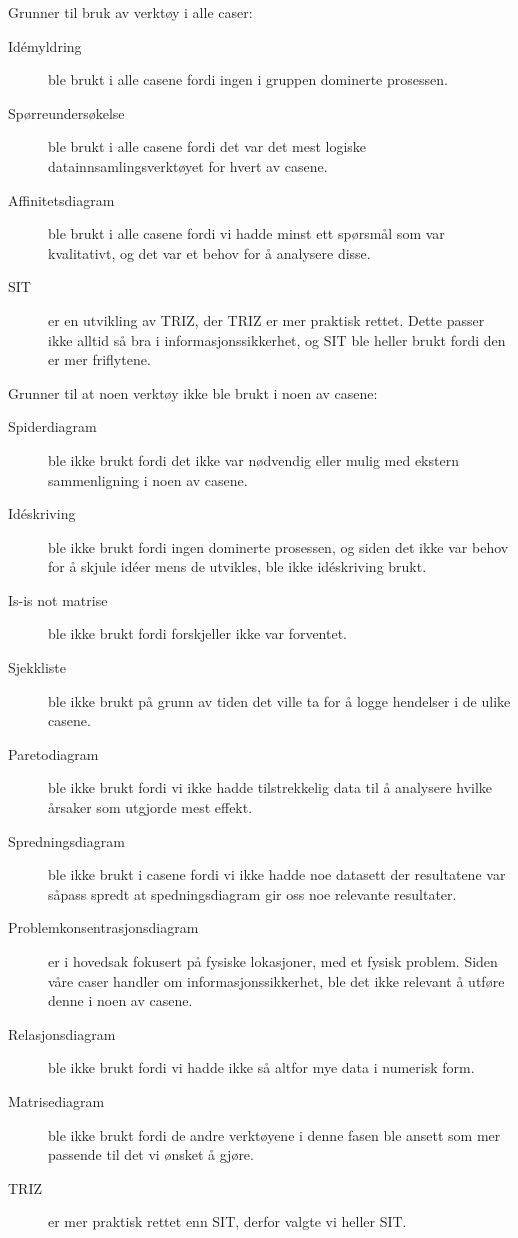 Grunner til bruk av verktøy i alle caser:
\begin{description}
    \item[Idémyldring] ble brukt i alle casene fordi ingen i gruppen dominerte prosessen.
    \item[Spørreundersøkelse] ble brukt i alle casene fordi det var det mest logiske datainnsamlingsverktøyet for hvert av casene.
    \item[Affinitetsdiagram] ble brukt i alle casene fordi vi hadde minst ett spørsmål som var kvalitativt, og det var et behov for å analysere disse.
    \item[SIT] er en utvikling av TRIZ, der TRIZ er mer praktisk rettet. Dette passer ikke alltid så bra i informasjonssikkerhet, og SIT ble heller brukt fordi den er mer friflytene. 
\end{description}

Grunner til at noen verktøy ikke ble brukt i noen av casene:
\begin{description}
    \item[Spiderdiagram] ble ikke brukt fordi det ikke var nødvendig eller mulig med ekstern sammenligning i noen av casene.
    \item[Idéskriving] ble ikke brukt fordi ingen dominerte prosessen, og siden det ikke var behov for å skjule idéer mens de utvikles, ble ikke idéskriving brukt.
    \item[Is-is not matrise] ble ikke brukt fordi forskjeller ikke var forventet.
    \item[Sjekkliste] ble ikke brukt på grunn av tiden det ville ta for å logge hendelser i de ulike casene. 
    \item[Paretodiagram] ble ikke brukt fordi vi ikke hadde tilstrekkelig data til å analysere hvilke årsaker som utgjorde mest effekt. 
    \item[Spredningsdiagram] ble ikke brukt i casene fordi vi ikke hadde noe datasett der resultatene var såpass spredt at spedningsdiagram gir oss noe relevante resultater. 
    \item[Problemkonsentrasjonsdiagram] er i hovedsak fokusert på fysiske lokasjoner, med et fysisk problem. Siden våre caser handler om informasjonssikkerhet, ble det ikke relevant å utføre denne i noen av casene. 
    \item[Relasjonsdiagram] ble ikke brukt fordi vi hadde ikke så altfor mye data i numerisk form. 
    \item[Matrisediagram] ble ikke brukt fordi de andre verktøyene i denne fasen ble ansett som mer passende til det vi ønsket å gjøre.
    \item[TRIZ] er mer praktisk rettet enn SIT, derfor valgte vi heller SIT. 
\end{description}


